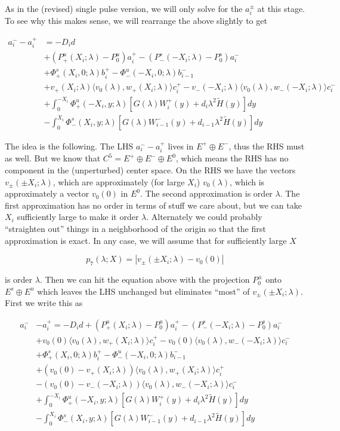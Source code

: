 \documentclass[12pt]{article}
\begin{document}
\begin{enumerate}
As in the (revised) single pulse version, we will only solve for the $a_i^\pm$ at this stage. To see why this makes sense, we will rearrange the above slightly to get

\begin{align*}
a_i^- - a_i^+ &= -D_i d  \\
&+ (P^u_+(X_i; \lambda) - P_0^u)a_i^+ - (P^s_-(-X_i; \lambda) - P_0^s)a_i^- \\
&+ \Phi^s_+(X_i, 0; \lambda)b_i^+ - \Phi^u_-(-X_i, 0; \lambda)b_{i-1}^- \\
&+ v_+(X_i; \lambda) \langle v_0(\lambda), w_+(X_i; \lambda) \rangle c_i^+ - v_-(-X_i; \lambda) \langle v_0(\lambda), w_-(-X_i; \lambda) \rangle c_i^- \\
&+ \int_0^{-X_i} \Phi^u_+(-X_i, y; \lambda) [ G(\lambda)W_i^+(y) + d_i \lambda^2 \tilde{H}(y) ] dy \\
&- \int_0^{X_i} \Phi^s_-(X_i, y; \lambda) [ G(\lambda)W_{i-1}^-(y) + d_{i-1} \lambda^2 \tilde{H}(y) ] dy
\end{align*}

The idea is the following. The LHS $a_i^- - a_i^+$ lives in $E^+ \oplus E^-$, thus the RHS must as well. But we know that $C^5 = E^+ \oplus E^- \oplus E^0$, which means the RHS has no component in the (unperturbed) center space. On the RHS we have the vectors $v_\pm(\pm X_i; \lambda)$, which are approximately (for large $X_i$) $v_0(\lambda)$, which is approximately a vector $v_0(0)$ in $E^0$. The second approximation is order $\lambda$. The first approximation has no order in terms of stuff we care about, but we can take $X_i$ sufficiently large to make it order $\lambda$. Alternately we could probably ``straighten out'' things in a neighborhood of the origin so that the first approximation is exact. In any case, we will assume that for sufficiently large $X$

\[
p_7(\lambda; X) = |v_\pm(\pm X_i; \lambda) - v_0(0)| 
\]

is order $\lambda$. Then we can hit the equation above with the projection $P_0^\pm$ onto $E^s \oplus E^u$ which leaves the LHS unchanged but eliminates ``most'' of $v_\pm(\pm X_i; \lambda)$. First we write this as

\begin{align*}
a_i^- &- a_i^+ = -D_i d + (P^u_+(X_i; \lambda) - P_0^u)a_i^+ - (P^s_-(-X_i; \lambda) - P_0^s)a_i^- \\
&+ v_0(0) \langle v_0(\lambda), w_+(X_i; \lambda) \rangle c_i^+ 
- v_0(0) \langle v_0(\lambda), w_-(-X_i; \lambda) \rangle c_i^- \\
&+ \Phi^s_+(X_i, 0; \lambda)b_i^+ - \Phi^u_-(-X_i, 0; \lambda)b_{i-1}^- \\
&+ (v_0(0) - v_+(X_i; \lambda)) \langle v_0(\lambda), w_+(X_i; \lambda) \rangle c_i^+ \\
&- (v_0(0) - v_-(-X_i; \lambda)) \langle v_0(\lambda), w_-(-X_i; \lambda) \rangle c_i^- \\
&+ \int_0^{-X_i} \Phi^u_+(-X_i, y; \lambda) [ G(\lambda)W_i^+(y) + d_i \lambda^2 \tilde{H}(y) ] dy \\
&- \int_0^{X_i} \Phi^s_-(X_i, y; \lambda) [ G(\lambda)W_{i-1}^-(y) + d_{i-1} \lambda^2 \tilde{H}(y) ] dy  
\end{align*}


\end{enumerate}
\end{document}
